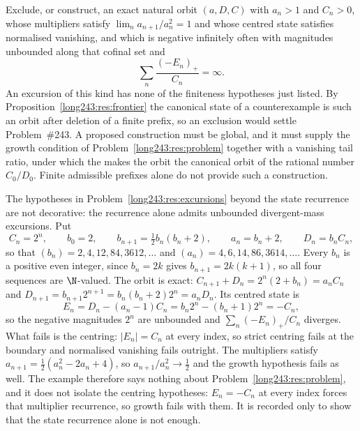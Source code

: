 \documentclass[11pt]{article}
\begin{document}
\begin{problem}\label{long243:res:excursions}
Exclude, or construct, an exact natural orbit $(a,D,C)$ with $a_n>1$ and
$C_n>0$, whose multipliers satisfy $\lim_n a_{n+1}/a_n^{2}=1$ and whose centred
state satisfies normalised vanishing, and which is
negative infinitely often with magnitudes unbounded along that cofinal set and
\[
 \sum_n\frac{(-E_n)_+}{C_n}=\infty .
\]
An excursion of this kind has none of the finiteness hypotheses just listed.
By Proposition~\ref{long243:res:frontier} the canonical state of a counterexample is
such an orbit after deletion of a finite prefix, so an exclusion would settle
Problem~\#243.  A proposed construction must be global, and it must supply the growth
condition of Problem~\ref{long243:res:problem} together with a vanishing tail ratio,
under which the
 makes the orbit the canonical orbit of the rational number
$C_0/D_0$.  Finite admissible prefixes alone do not provide such a
construction.
\end{problem}

\begin{remark}
The hypotheses in Problem~\ref{long243:res:excursions} beyond the state recurrence are
not decorative: the recurrence alone admits unbounded divergent-mass
excursions.  Put
\[
 C_n=2^{n},\qquad b_0=2,\qquad b_{n+1}=\tfrac12 b_n(b_n+2),\qquad
 a_n=b_n+2,\qquad D_n=b_nC_n ,
\]
so that $(b_n)=2,4,12,84,3612,\ldots$ and $(a_n)=4,6,14,86,3614,\ldots$.  Every
$b_n$ is a positive even integer, since $b_n=2k$ gives $b_{n+1}=2k(k+1)$, so all
four sequences are $\N$-valued.  The orbit is exact:
$C_{n+1}+D_n=2^{n}(2+b_n)=a_nC_n$ and
$D_{n+1}=b_{n+1}2^{n+1}=b_n(b_n+2)2^{n}=a_nD_n$.  Its centred state is
\[
 E_n=D_n-(a_n-1)C_n=b_n2^{n}-(b_n+1)2^{n}=-C_n ,
\]
so the negative magnitudes $2^{n}$ are unbounded and $\sum_n(-E_n)_+/C_n$
diverges.  What fails is the centring: $|E_n|=C_n$ at every index, so strict
centring fails at the boundary and normalised vanishing fails outright.  The
multipliers satisfy $a_{n+1}=\tfrac12(a_n^{2}-2a_n+4)$, so
$a_{n+1}/a_n^{2}\to\tfrac12$ and the growth hypothesis fails as well.  The
example therefore says nothing about Problem~\ref{long243:res:problem}, and it does not
isolate the centring hypotheses: $E_n=-C_n$ at every index forces that
multiplier recurrence, so growth fails with them.  It is recorded only to show
that the state recurrence alone is not enough.
\end{remark}
\end{document}
